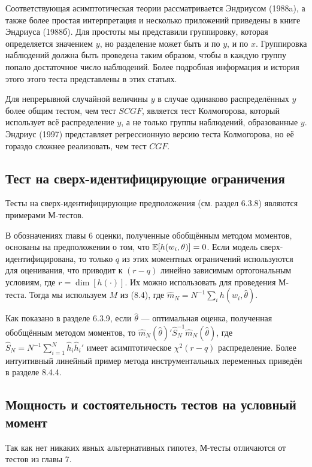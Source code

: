 Соответствующая асимптотическая теории рассматривается Эндриусом (1988a), а также более простая интерпретация и несколько приложений приведены в книге Эндриуса (1988б). Для простоты мы представили группировку, которая определяется значением $y$, но разделение может быть и по $y$, и по $x$. Группировка наблюдений должна быть проведена таким образом, чтобы в каждую группу попало достаточное число наблюдений. Более подробная информация и история этого этого теста представлены в этих статьях.

Для непрерывной случайной величины $y$ в случае одинаково распределённых $y$ более общим тестом, чем тест $SCGF$, является тест Колмогорова, который использует всё распределение $y$, а не только группы наблюдений, образованные $y$.  Эндриус (1997) представляет регрессионную версию теста Колмогорова, но её гораздо сложнее реализовать, чем тест $CGF$.

\subsection{Тест на сверх-идентифицирующие ограничения}

Тесты на сверх-идентифицирующие предположения (см. раздел 6.3.8) являются примерами М-тестов.

В обозначениях главы 6 оценки, полученные обобщённым методом моментов, основаны на предположении о том, что $\mathbb{E}[h(w_i,\theta)] = 0$. Если модель сверх-идентифицирована, то только $q$ из этих моментных ограничений используются для оценивания, что приводит к $(r - q)$ линейно зависимым ортогональным условиям, где $r = \dim[h(\cdot)]$. Их можно использовать для проведения М-теста. Тогда мы используем $M$ из (8.4), где $\hat{m}_N = N^{-1}\sum_i h(w_i, \hat{\theta})$. 

Как показано в разделе 6.3.9, если $\hat{\theta}$ --- оптимальная оценка, полученная обобщённым методом моментов, то $\hat{m}_N(\hat{\theta})'\hat{S}_N^{-1}\hat{m}_N(\hat{\theta})$, где $\hat{S}_N = N^{-1}\sum_{i=1}^N \hat{h}_i\hat{h}_i'$ имеет асимптотическое $\chi^2(r - q)$ распределение. Более интуитивный линейный пример метода инструментальных переменных приведён в разделе 8.4.4.

\subsection{Мощность и состоятельность тестов на условный момент}

Так как нет никаких явных альтернативных гипотез, М-тесты отличаются от тестов из главы 7.

